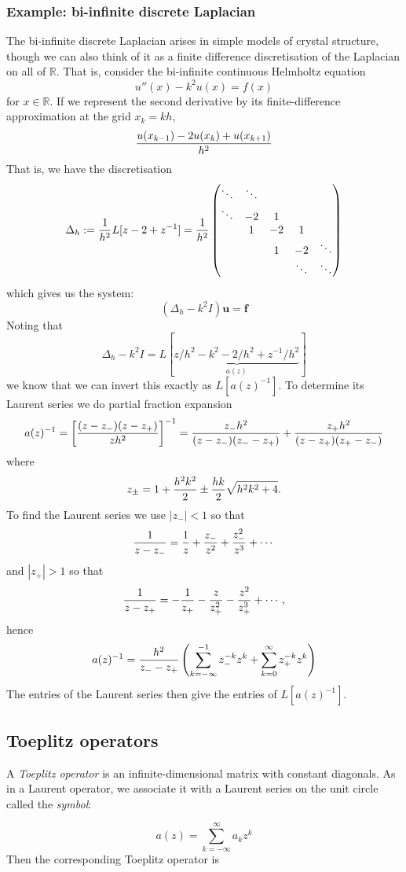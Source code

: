 \documentclass[12pt,landscape]{article}
\def\R{ {\mathbb R} }
\def\vc#1{ {\mathbf #1} }
\def\br[#1]{\left[{#1}\right]}
\def\sopmatrix#1{ \begin{pmatrix}#1\end{pmatrix} }
\begin{document}
{\subsubsection{Example: bi-infinite discrete Laplacian}
The bi-infinite discrete Laplacian arises in simple models of crystal structure, though we can also think of it as a finite difference discretisation of the Laplacian on all of $\R$. That is, consider the bi-infinite continuous Helmholtz equation
\[
u''(x) - k^2 u(x) = f(x)
\]
for $x \in \R$. If we represent the second derivative by its finite-difference approximation at the grid $x_k = k h$,
\[
{u(x_{k-1}) -2 u(x_k) + u(x_{k+1}) \over h^2}
\]
That is, we have the discretisation
\[
\Delta_h := {1 \over h^2}L[z-2+z^{-1}] = {1 \over h^2} \sopmatrix{\ddots & \ddots \\
                \ddots & -2 & 1 \\
                & 1 & -2 & 1 \\
                && 1 & -2 & \ddots \\
                &&&\ddots & \ddots}
\]
which gives us the system:
\[
(\Delta_h - k^2 I) \vc u = \vc f
\]
\newpage
Noting that
\[
\Delta_h - k^2 I  = L[\underbrace{z/h^2  - k^2 - 2/h^2 + z^{-1}/h^2}_{a(z)}]
\]
we know that we can invert this exactly as $L[a(z)^{-1}]$. To determine its Laurent series we do partial fraction expansion
\[
a(z)^{-1} = \br[{(z-z_-) (z - z_+) \over  z h^2} ]^{-1} =
{z_- h^2 \over (z-z_-) (z_--z_+)}  + {z_+ h^2 \over (z-z_+) (z_+-z_-)}
\]
where
\[
z_\pm = 1 + {h^2k^2 \over 2} \pm {h k \over 2} \sqrt{h^2 k^2+4}.
\]
To find the Laurent series we use $|z_-| < 1$ so that
\[
{1 \over z - z_-} = {1 \over z} + {z_- \over z^2} + {z_-^2 \over z^3} + \cdots
\]
and $|z_+| > 1$ so that
\[
{1 \over z - z_+} = -{1 \over z_+} - {z \over z_+^2} - {z^2 \over z_+^3} + \cdots,
\]
hence
\[
a(z)^{-1} = {h^2 \over z_- - z_+} \left(\sum_{k=-\infty}^{-1} z_-^{-k} z^k + \sum_{k=0}^\infty z_+^{-k} z^k\right)
\]
The entries of the Laurent series then give the entries of $L[a(z)^{-1}]$.
\newpage
\subsection{Toeplitz operators}
A \emph{Toeplitz operator} is an infinite-dimensional matrix with constant diagonals. As in a Laurent operator, we associate it with a Laurent series on the unit circle called the \emph{symbol}:

\[
a(z) = \sum_{k=-\infty}^\infty a_k z^k
\]
Then the corresponding Toeplitz operator is

}
\end{document}
